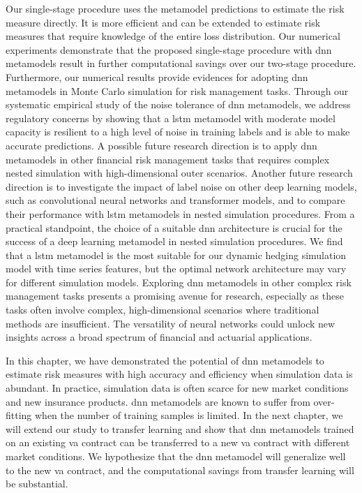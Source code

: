 Our single-stage procedure uses the metamodel predictions to estimate the risk measure directly.
It is more efficient and can be extended to estimate risk measures that require knowledge of the entire loss distribution.
Our numerical experiments demonstrate that the proposed single-stage procedure with \gls{dnn} metamodels result in further computational savings over our two-stage procedure. 
Furthermore, our numerical results provide evidences for adopting \gls{dnn} metamodels in Monte Carlo simulation for risk management tasks.
Through our systematic empirical study of the noise tolerance of \gls{dnn} metamodels, we address regulatory concerns by showing that a \gls{lstm} metamodel with moderate model capacity is resilient to a high level of noise in training labels and is able to make accurate predictions.
A possible future research direction is to apply \gls{dnn} metamodels in other financial risk management tasks that requires complex nested simulation with high-dimensional outer scenarios.
Another future research direction is to investigate the impact of label noise on other deep learning models, such as convolutional neural networks and transformer models, and to compare their performance with \gls{lstm} metamodels in nested simulation procedures. 
From a practical standpoint, the choice of a suitable \gls{dnn} architecture is crucial for the success of a deep learning metamodel in nested simulation procedures.
We find that a \gls{lstm} metamodel is the most suitable for our dynamic hedging simulation model with time series features, but the optimal network architecture may vary for different simulation models.
Exploring \gls{dnn} metamodels in other complex risk management tasks presents a promising avenue for research, especially as these tasks often involve complex, high-dimensional scenarios where traditional methods are insufficient. 
The versatility of neural networks could unlock new insights across a broad spectrum of financial and actuarial applications.

In this chapter, we have demonstrated the potential of \gls{dnn} metamodels to estimate risk measures with high accuracy and efficiency when simulation data is abundant.
In practice, simulation data is often scarce for new market conditions and new insurance products.
\gls{dnn} metamodels are known to suffer from over-fitting when the number of training samples is limited.
In the next chapter, we will extend our study to transfer learning and show that \gls{dnn} metamodels trained on an existing \gls{va} contract can be transferred to a new \gls{va} contract with different market conditions.
We hypothesize that the \gls{dnn} metamodel will generalize well to the new \gls{va} contract, and the computational savings from transfer learning will be substantial.